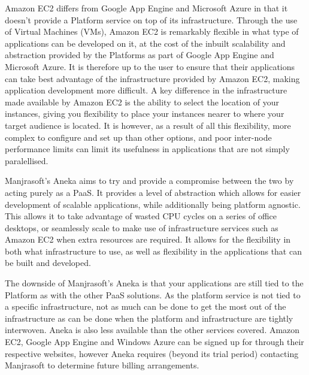 Amazon EC2 differs from Google App Engine and Microsoft Azure in that it doesn't provide a Platform service on top of its infrastructure. Through the use of Virtual Machines (VMs), Amazon EC2 is remarkably flexible in what type of applications can be developed on it, at the cost of the inbuilt scalability and abstraction provided by the Platforms as part of Google App Engine and Microsoft Azure. It is therefore up to the user to ensure that their applications can take best advantage of the infrastructure provided by Amazon EC2, making application development more difficult. A key difference in the infrastructure made available by Amazon EC2 is the ability to select the location of your instances, giving you flexibility to place your instances nearer to where your target audience is located. It is however, as a result of all this flexibility, more complex to configure and set up than other options, and poor inter-node performance limits can limit its usefulness in applications that are not simply paralellised.  

Manjrasoft's Aneka aims to try and provide a compromise between the two by acting purely as a PaaS. It provides a level of abstraction which allows for easier development of scalable applications, while additionally being platform agnostic. This allows it to take advantage of wasted CPU cycles on a series of office desktops, or seamlessly scale to make use of infrastructure services such as Amazon EC2 when extra resources are required. It allows for the flexibility in both what infrastructure to use, as well as flexibility in the applications that can be built and developed. 

The downside of Manjrasoft's Aneka is that your applications are still tied to the Platform as with the other PaaS solutions. As the platform service is not tied to a specific infrastructure, not as much can be done to get the most out of the infrastructure as can be done when the platform and infrastructure are tightly interwoven. Aneka is also less available than the other services covered. Amazon EC2, Google App Engine and Windows Azure can be signed up for through their respective websites, however Aneka requires (beyond its trial period) contacting Manjrasoft to determine future billing arrangements.
